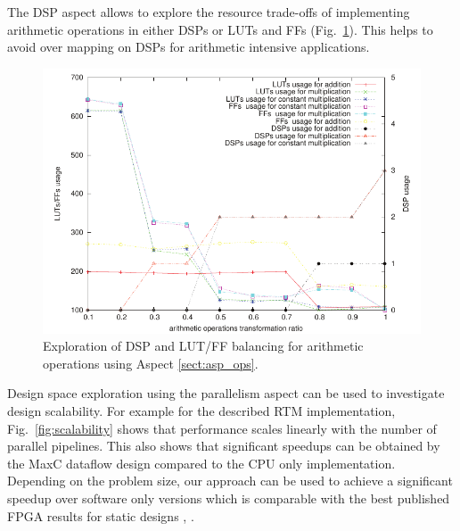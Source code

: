 The DSP aspect allows to explore the resource trade-offs of
implementing arithmetic operations in either DSPs or LUTs and FFs
(Fig.~\ref{fig:arith}). This helps to avoid over mapping on DSPs for
arithmetic intensive applications.

\begin{figure}[!h]
\includegraphics[scale=0.7]{figs/arith}
\caption{Exploration of DSP and LUT/FF balancing for arithmetic
  operations using Aspect \ref{sect:asp_ops}.}
\label{fig:arith}
\end{figure}

Design space exploration using the parallelism aspect can be used to
investigate design scalability. For example for the described RTM
implementation, Fig.~\ref{fig:scalability} shows that performance
scales linearly with the number of parallel pipelines. This also shows
that significant speedups can be obtained by the MaxC dataflow design
compared to the CPU only implementation. Depending on the problem
size, our approach can be used to achieve a significant speedup over
software only versions which is comparable with the best published
FPGA results for static designs
\cite{Xinyu:Qiwei:Luk:Qiang:Pell:2012}, \cite{araya2011assessing}.



